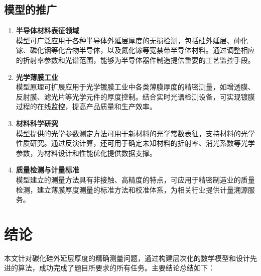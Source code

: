 \documentclass[withoutpreface,bwprint]{cumcmthesis} %
\begin{document}
\subsection{模型的推广}

\begin{enumerate}
    \item \textbf{半导体材料表征领域}\\
          模型可广泛应用于各种半导体外延层厚度的无损检测，包括硅外延层、砷化镓、磷化铟等化合物半导体，以及氮化镓等宽禁带半导体材料。通过调整相应的折射率参数和光谱范围，能够为半导体器件制造提供重要的工艺监控手段。

    \item \textbf{光学薄膜工业}\\
          模型原理可扩展应用于光学镀膜工业中各类薄膜厚度的精密测量，如增透膜、反射膜、滤光片等光学元件的厚度控制。结合实时光谱检测设备，可实现镀膜过程的在线监控，提高产品质量和生产效率。

    \item \textbf{材料科学研究}\\
          模型提供的光学参数测定方法可用于新材料的光学常数表征，支持材料的光学性质研究。通过反演计算，还可用于确定未知材料的折射率、消光系数等光学参数，为材料设计和性能优化提供数据支撑。

    \item \textbf{质量检测与计量标准}\\
          模型建立的测量方法具有非接触、高精度的特点，可应用于精密制造业的质量检测，建立薄膜厚度测量的标准方法和校准体系，为相关行业提供计量溯源服务。
\end{enumerate}

\section{结论}
本文针对碳化硅外延层厚度的精确测量问题，通过构建层次化的数学模型和设计先进的算法，成功完成了题目所要求的所有任务。主要结论总结如下：
\end{document}
